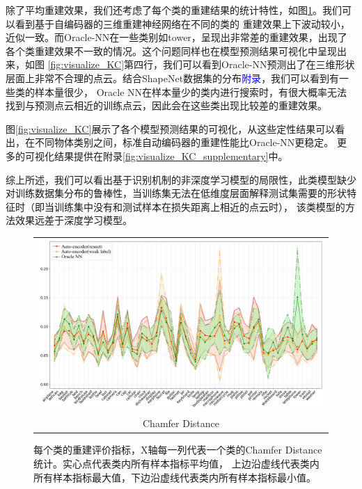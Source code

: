 \documentclass[bachelor, nocolorlinks, printoneside]{seuthesis} %
\newcommand\TODO[1]{\textcolor{blue}{#1}}
\begin{document}
\begin{Main}
除了平均重建效果，我们还考虑了每个类的重建结果的统计特性，如图\ref{fig:metric_per_class}。我们可以看到基于自编码器的三维重建神经网络在不同的类的
重建效果上下波动较小，近似一致。而Oracle-NN在一些类别如tower，呈现出非常差的重建效果，出现了各个类重建效果不一致的情况。这个问题同样也在模型预测结果可视化中呈现出来，如图
\ref{fig:visualize_KC}第四行，我们可以看到Oracle-NN预测出了在三维形状层面上非常不合理的点云。结合ShapeNet数据集的分布\TODO{附录}，我们可以看到有一些类的样本量很少，
Oracle NN在样本量少的类内进行搜索时，有很大概率无法找到与预测点云相近的训练点云，因此会在这些类出现比较差的重建效果。

图\ref{fig:visualize_KC}展示了各个模型预测结果的可视化，从这些定性结果可以看出，在不同物体类别之间，标准自动编码器的重建性能比Oracle-NN更稳定。
更多的可视化结果提供在附录\ref{fig:visualize_KC_supplementary}中。

综上所述，我们可以看出基于识别机制的非深度学习模型的局限性，此类模型缺少对训练数据集分布的鲁棒性，当训练集无法在低维度层面解释测试集需要的形状特征时（即当训练集中没有和测试样本在损失距离上相近的点云时），
该类模型的方法效果远差于深度学习模型。

\begin{figure}
\centering
\begin{tabular}{c@{}}
\includegraphics[width=0.99\columnwidth]{figs/CD_per_shape_roman.png} \\
Chamfer Distance \\
\end{tabular}
\caption{每个类的重建评价指标，X轴每一列代表一个类的Chamfer Distance统计。实心点代表类内所有样本指标平均值，
上边沿虚线代表类内所有样本指标最大值，下边沿虚线代表类内所有样本指标最小值。}
\label{fig:metric_per_class}
\end{figure}


\end{Main}
\end{document}
